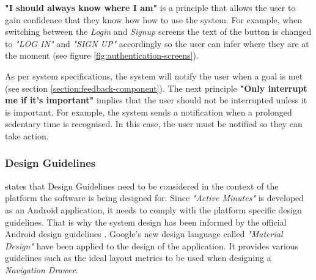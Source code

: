         \textbf{"I should always know where I am"} is a principle that allows the user to gain confidence that they know how how to use the system. For example, when switching between the \textit{Login} and \textit{Signup} screens the text of the button is changed to \textit{"LOG IN"} and \textit{"SIGN UP"} accordingly so the user can infer where they are at the moment (see figure \ref{fig:authentication-screens}).
        
        As per system specifications, the system will notify the user when a goal is met (see section \ref{section:feedback-component}). The next principle \textbf{"Only interrupt me if it's important"} implies that the user should not be interrupted unless it is important. For example, the system sends a notification when a prolonged sedentary time is recognised. In this case, the user must be notified so they can take action.
        
        \subsubsection{Design Guidelines}
        \citet[57-59]{bell2005} states that Design Guidelines need to be considered in the context of the platform the software is being designed for. Since \textit{"Active Minutes"} is developed as an Android application, it needs to comply with the platform specific design guidelines. That is why the system design has been informed by the official Android design guidelines \citep{googleamaterialdesign}. Google's new design language called \textit{"Material Design"} have been applied to the design of the application. It provides various guidelines such as the ideal layout metrics to be used when designing a \textit{Navigation Drawer}. 